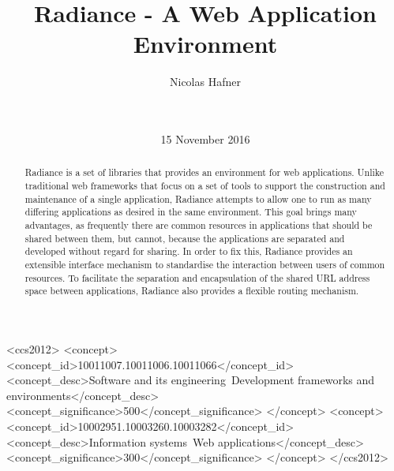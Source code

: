 \documentclass{sig-alternate}
\begin{document}
\doi{}
\isbn{}

\begin{CCSXML}
<ccs2012>
  <concept>
    <concept_id>10011007.10011006.10011066</concept_id>
    <concept_desc>Software and its engineering~Development frameworks and environments</concept_desc>
    <concept_significance>500</concept_significance>
  </concept>
  <concept>
    <concept_id>10002951.10003260.10003282</concept_id>
    <concept_desc>Information systems~Web applications</concept_desc>
    <concept_significance>300</concept_significance>
  </concept>
</ccs2012>
\end{CCSXML}


\title{Radiance - A Web Application Environment}

\author{
\alignauthor
Nicolas Hafner\\
       \\
       \\
}
\date{15 November 2016}

\maketitle

\begin{abstract}
  Radiance\cite{radiance} is a set of libraries that provides an environment for web applications. Unlike traditional web frameworks that focus on a set of tools to support the construction and maintenance of a single application, Radiance attempts to allow one to run as many differing applications as desired in the same environment. This goal brings many advantages, as frequently there are common resources in applications that should be shared between them, but cannot, because the applications are separated and developed without regard for sharing. In order to fix this, Radiance provides an extensible interface mechanism to standardise the interaction between users of common resources. To facilitate the separation and encapsulation of the shared URL address space between applications, Radiance also provides a flexible routing mechanism.
\end{abstract}
\end{document}
